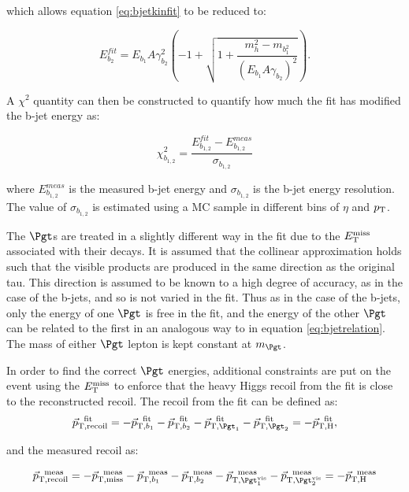 which allows equation \ref{eq:bjetkinfit} to be reduced to:

\begin{equation}
E_{b_{2}}^{fit} = E_{b_{1}}A\gamma_{b_{2}}^{2}\left(-1 + \sqrt{1 +
\frac{m_{h}^{2} -
m_{b_{1}^{2}}}{\left(E_{b_{1}}A\gamma_{b_{2}}\right)^{2}}}\right) .
\label{eq:bjetrelation}
\end{equation}

A $\chi^{2}$ quantity can then be constructed to quantify how much the fit has
modified the b-jet energy as:

\begin{equation}
\chi_{b_{1,2}}^{2} = \frac{E_{b_{1,2}}^{fit} -
E_{b_{1,2}}^{meas}}{\sigma_{b_{1,2}}}
\end{equation}

where $E_{b_{1,2}}^{meas}$ is the measured b-jet energy and $\sigma_{b_{1,2}}$
is the b-jet energy resolution. The value of $\sigma_{b_{1,2}}$ is estimated
using a \ac{MC} sample in different bins of $\eta$ and $p_{\mathrm{T}}$. 

The $\Pgt$s are treated in a slightly different way in the fit due to the $E_{\mathrm{T}}^{\text{miss}}$
associated with their decays. It is assumed that the collinear approximation
holds such that the visible products are produced in the same direction as the
original tau. This direction is assumed to be known to a high degree of
accuracy, as in the case of the b-jets, and so is not varied in the fit. Thus as
in the case of the b-jets, only the energy of one $\Pgt$ is free in the fit, and
the energy of the other $\Pgt$ can be related to the first in an analogous way
to in equation \ref{eq:bjetrelation}. The mass of either $\Pgt$ lepton is kept
constant at $m_{\Pgt}$.  

In order to find the correct $\Pgt$ energies, additional constraints are put on
the event using the $E_{\mathrm{T}}^{\text{miss}}$ to enforce that the heavy Higgs recoil from the fit
is close to the reconstructed recoil. The recoil from the fit can be defined as:
\begin{equation}
\vec{p}_{\text{T},\text{recoil}}^{\text{~~fit}} = -
\vec{p}_{\text{T},b_{1}}^{\text{~~fit}} -
\vec{p}_{\text{T},b_{2}}^{\text{~~fit}} -
\vec{p}_{\text{T},\Pgt_{1}}^{\text{~~fit}} - \vec{p}_{\text{T},\Pgt_{2}}^{\text{~~fit}} = -
\vec{p}_{\text{T},\text{H}}^{\text{~~fit}} ,
\end{equation}

and the measured recoil as:

\begin{equation}
\vec{p}_{\text{T},\text{recoil}}^{\text{~~meas}} = -
\vec{p}_{\text{T},\text{miss}}^{\text{~~meas}} -
\vec{p}_{\text{T},b_{1}}^{\text{~~meas}} - \vec{p}_{\text{T},b_{2}}^{\text{~~meas}} -
\vec{p}_{\text{T},\Pgt_{1}^{\text{vis}}}^{\text{~~meas}} -
\vec{p}_{\text{T},\Pgt_{2}^{\text{vis}}}^{\text{~~meas}} = -
\vec{p}_{\text{T},\text{H}}^{\text{~~meas}}
\end{equation}

